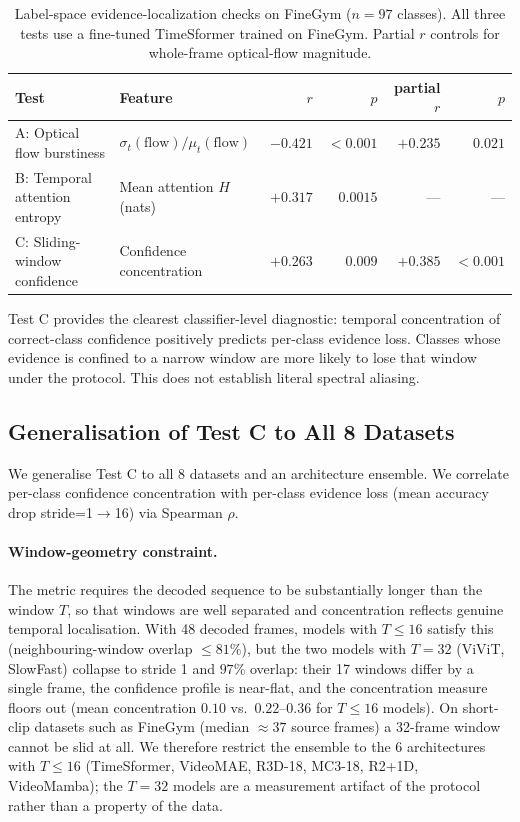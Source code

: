 \documentclass[runningheads]{llncs}
\newcommand{\tabtight}{\setlength{\tabcolsep}{3.5pt}\renewcommand{\arraystretch}{1.12}}
\newcommand{\rev}[1]{\textcolor{revblue}{#1}}
\newcommand{\revdel}[1]{}
\begin{document}
\begin{table}[!htbp]
\centering
\caption{Label-space evidence-localization checks on FineGym ($n=97$ classes). All three tests use a fine-tuned TimeSformer trained on FineGym. Partial $r$ controls for whole-frame optical-flow magnitude.}
\label{tab:label_space_nyquist}
\scriptsize\tabtight
\begin{tabular}{l l r r r r}
\toprule
Test & Feature & $r$ & $p$ & partial $r$ & $p$ \\
\midrule
A: Optical flow burstiness & $\sigma_t(\text{flow}) / \mu_t(\text{flow})$ & $-0.421$ & ${<}0.001$ & $+0.235$ & $0.021$ \\
B: Temporal attention entropy & Mean attention $H$ (nats) & $+0.317$ & $0.0015$ & --- & --- \\
C: Sliding-window confidence & Confidence concentration & $+0.263$ & $0.009$ & $\mathbf{+0.385}$ & $\mathbf{<0.001}$ \\
\bottomrule
\end{tabular}
\end{table}

Test C provides the clearest classifier-level diagnostic: temporal concentration of correct-class confidence positively predicts per-class \rev{evidence loss}\revdel{aliasing}. Classes whose evidence is confined to a narrow window are more likely to lose that window under the protocol. This does not establish literal spectral aliasing.

\subsection*{Generalisation of Test C to All 8 Datasets}
\label{sec:sup_sw_generalisation}

We generalise Test C to all 8 datasets and an architecture ensemble. We correlate per-class confidence concentration with per-class \rev{evidence loss}\revdel{aliasing loss} (mean accuracy drop stride=1$\to$16) via Spearman $\rho$.

\paragraph{Window-geometry constraint.} The metric requires the decoded sequence to be substantially longer than the window $T$, so that windows are well separated and concentration reflects genuine temporal localisation. With 48 decoded frames, models with $T\le16$ satisfy this (neighbouring-window overlap $\le81\%$), but the two models with $T=32$ (ViViT, SlowFast) collapse to stride 1 and $97\%$ overlap: their 17 windows differ by a single frame, the confidence profile is near-flat, and the concentration measure floors out (mean concentration $0.10$ vs.\ $0.22$--$0.36$ for $T\le16$ models). On short-clip datasets such as FineGym (median ${\approx}37$ source frames) a 32-frame window cannot be slid at all. We therefore restrict the ensemble to the 6 architectures with $T\le16$ (TimeSformer, VideoMAE, R3D-18, MC3-18, R2+1D, VideoMamba); the $T=32$ models are a measurement artifact of the protocol rather than a property of the data.
\end{document}
